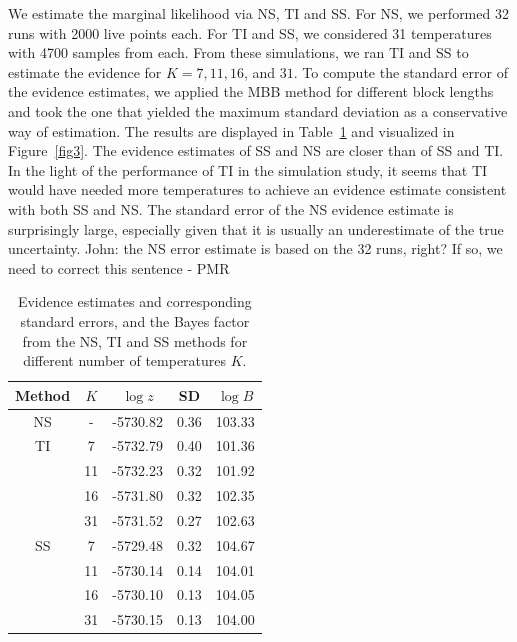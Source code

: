 \documentclass[aps,reprint,amsmath,amssymb,showpacs,showkeys]{revtex4-1}%
\newcommand{\cb}{ \color{blue}}
\begin{document}
We estimate the marginal likelihood via NS, TI and SS.  For NS, we performed 32
runs with 2000 live points each. For TI and SS, we considered 31 temperatures
with 4700 samples from each.  From these simulations, we ran TI and SS to estimate the evidence
for $K=7, 11, 16$, and $31$.  To compute the standard error of the evidence estimates, we applied the MBB method
for different block lengths and took the one that yielded the maximum standard
deviation  as a conservative way of estimation. The results are displayed in Table~\ref{tab:results} and visualized in Figure~\ref{fig3}.
The evidence estimates of SS and NS are closer than of SS and TI. In the light of the performance of  TI in the simulation study, it seems that TI would have
needed more temperatures to achieve an evidence estimate consistent with both SS and NS. The standard error of the NS evidence estimate is surprisingly large, especially
given that it is usually an underestimate of the true uncertainty. {\cb John: the NS error estimate is based on the 32 runs, right? If so, we need to correct this sentence - PMR}

\begin{table}
	\caption{\label{tab:results} Evidence estimates and corresponding standard errors, and the Bayes factor from the NS, TI and SS methods for different number of temperatures $K$.}
	\begin{ruledtabular}
		\begin{tabular}{ccccc}
			Method & $K$ & $\log z$ & SD& $\log B$  \\ \hline
			NS & - &-5730.82 & 0.36  & 103.33    \\ \hline
			TI   & 7 &-5732.79 &  0.40 & 101.36     \\
			      & 11 &-5732.23 & 0.32 &101.92\\
			      & 16 &-5731.80 & 0.32 &102.35\\
			      & 31 &-5731.52 & 0.27 &102.63\\ \hline
			SS & 7   &-5729.48 & 0.32 & 104.67  \\
			      & 11  &-5730.14 & 0.14 &104.01\\
			      & 16 &-5730.10 & 0.13 &104.05\\
			      & 31 &-5730.15 & 0.13 &104.00\\
		\end{tabular}
	\end{ruledtabular}
\end{table}
\end{document}
